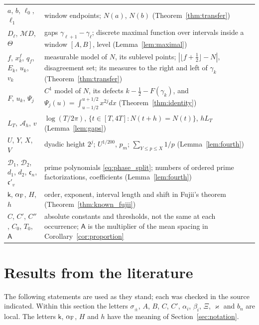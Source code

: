 \documentclass[11pt,a4paper]{article}
\makeatletter
\numberwithin{equation}{section}
\DeclareRobustCommand{\CGref}[1]{\ref{#1}}
\DeclareRobustCommand{\CGeqref}[1]{\eqref{#1}}
\let\CG@origref\ref
\let\CG@origeqref\eqref
\newcommand{\CG@gettip}[1]{\@ifundefined{CGTip@#1}{#1}{\csname CGTip@#1\endcsname}}
\DeclareRobustCommand{\CGref}[1]{\pdftooltip{\CG@origref{#1}}{\CG@gettip{#1}}}
\DeclareRobustCommand{\CGeqref}[1]{\pdftooltip{\CG@origeqref{#1}}{\CG@gettip{#1}}}
\theoremstyle{definition}
\theoremstyle{remark}
\newcommand{\M}{\mathcal M}
\makeatother
\begin{document}
\begin{center}
\begin{longtable}{p{}p{}}
$a$, $b$, $\ell_0$, $\ell_1$ & window endpoints; $N(a)$, $N(b)$ (Theorem~\CGref{thm:transfer})\\
$D_\ell$, $\M D$, $\Theta$ & gaps $\gamma_{\ell+1}-\gamma_\ell$; discrete maximal function over intervals inside a window $[A,B]$, level (Lemma~\CGref{lem:maximal})\\
$f$, $x^f_k$, $q_f$, $E_k$, $u_k$, $v_k$ & measurable model of $N$, its sublevel points; $|\lfloor f+\frac12\rfloor-N|$, disagreement set; its measures to the right and left of $\gamma_k$ (Theorem~\CGref{thm:transfer})\\
$F$, $u_k$, $\Psi_j$ & $C^1$ model of $N$, its defects $k-\frac12-F(\gamma_k)$, and $\Psi_j(u)=\int_{u-1/2}^{u+1/2}x^{2j}dx$ (Theorem~\CGref{thm:identity})\\
$L_T$, $\mathcal A_h$, $v$ & $\log(T/2\pi)$, $\{t\in[T,4T]:N(t+h)=N(t)\}$, $hL_T$ (Lemma~\CGref{lem:gaps})\\
$U$, $Y$, $X$, $V$ & dyadic height $2^j$; $U^{1/200}$, $p_m$; $\sum_{Y\le p\le X}1/p$ (Lemma~\CGref{lem:fourth})\\
$\mathscr D_1$, $\mathscr D_2$, $d_1$, $d_2$, $\mathfrak c_n$, $\mathfrak c'_v$ & prime polynomials \CGeqref{eq:phase_split}; numbers of ordered prime factorizations, coefficients (Lemma~\CGref{lem:fourth})\\
$\mathsf k$, $\alpha_{\rm F}$, $H$, $h$ & order, exponent, interval length and shift in Fujii's theorem (Theorem~\CGref{thm:known_fujii})\\
$C$, $C'$, $C''$, $C_0$, $T_0$, $\mathsf A$ & absolute constants and thresholds, not the same at each occurrence; $\mathsf A$ is the multiplier of the mean spacing in Corollary~\CGref{cor:proportion}\\
\end{longtable}
\end{center}

\section{Results from the literature}\label{sec:external}

The following statements are used as they stand; each was checked in the source indicated. Within this section the letters $\sigma_\pm$, $A$, $B$, $C$, $C'$, $\alpha_i$, $\beta_i$, $\Xi$, $\varkappa$ and $b_n$ are local. The letters $\mathsf k$, $\alpha_{\rm F}$, $H$ and $h$ have the meaning of Section~\CGref{sec:notation}.
\end{document}
